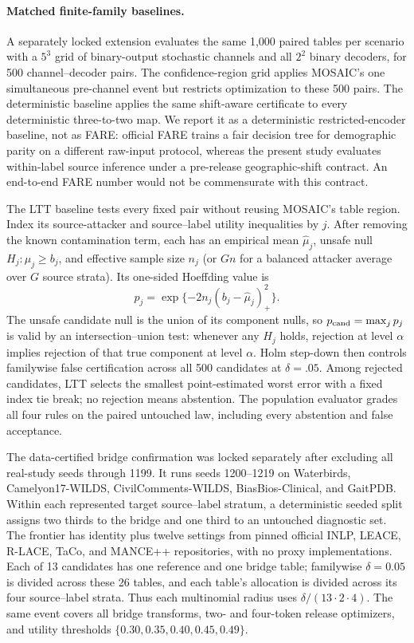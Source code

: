 \paragraph{Matched finite-family baselines.}
A separately locked extension evaluates the same 1,000 paired tables per
scenario with a $5^3$ grid of binary-output stochastic channels and all $2^2$
binary decoders, for 500 channel--decoder pairs. The confidence-region grid
applies MOSAIC's one simultaneous pre-channel event but restricts optimization
to these 500 pairs. The deterministic baseline applies the same shift-aware
certificate to every deterministic three-to-two map. We report it as a
deterministic restricted-encoder baseline, not as FARE: official FARE trains a
fair decision tree for demographic parity on a different raw-input protocol,
whereas the present study evaluates within-label source inference under a
pre-release geographic-shift contract. An end-to-end FARE number would not be
commensurate with this contract.

The LTT baseline tests every fixed pair without reusing MOSAIC's table region.
Index its source-attacker and source--label utility inequalities by $j$. After
removing the known contamination term, each has an empirical mean
$\widehat\mu_j$, unsafe null $H_j:\mu_j\geq b_j$, and effective sample size
$n_j$ (or $Gn$ for a balanced attacker average over $G$ source strata). Its
one-sided Hoeffding value is
\begin{equation}
 p_j=\exp\{-2n_j(b_j-\widehat\mu_j)_+^2\}.
 \label{supp:eq:lttcomponent}
\end{equation}
The unsafe candidate null is the union of its component nulls, so
$p_{\rm cand}=\max_j p_j$ is valid by an intersection--union test: whenever any
$H_j$ holds, rejection at level $\alpha$ implies rejection of that true
component at level $\alpha$. Holm step-down then controls familywise false
certification across all 500 candidates at $\delta=.05$. Among rejected
candidates, LTT selects the smallest point-estimated worst error with a fixed
index tie break; no rejection means abstention. The population evaluator grades
all four rules on the paired untouched law, including every abstention and
false acceptance.

The data-certified bridge confirmation was locked separately after excluding
all real-study seeds through 1199. It runs seeds 1200--1219 on Waterbirds,
Camelyon17-WILDS, CivilComments-WILDS, BiasBios-Clinical, and GaitPDB. Within
each represented target source--label stratum, a deterministic seeded split
assigns two thirds to the bridge and one third to an untouched diagnostic set.
The frontier has identity plus twelve settings from pinned official INLP,
LEACE, R-LACE, TaCo, and MANCE++ repositories, with no proxy implementations.
Each of 13 candidates has one reference and one bridge table; familywise
$\delta=0.05$ is divided across these 26 tables, and each table's allocation is
divided across its four source--label strata. Thus each multinomial radius uses
$\delta/(13\cdot2\cdot4)$. The same event covers all bridge transforms,
two- and four-token release optimizers, and utility thresholds
$\{0.30,0.35,0.40,0.45,0.49\}$.

